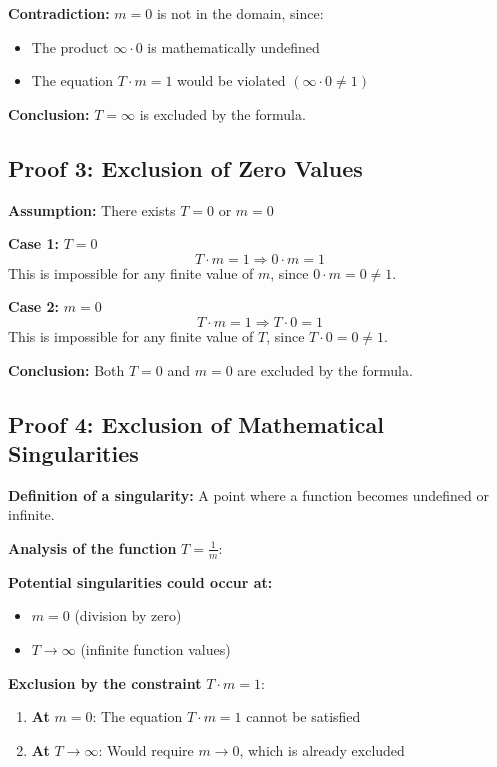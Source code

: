 	\textbf{Contradiction:} $m = 0$ is not in the domain, since:
	\begin{itemize}
		\item The product $\infty \cdot 0$ is mathematically undefined
		\item The equation $T \cdot m = 1$ would be violated $(\infty \cdot 0 \neq 1)$
	\end{itemize}
	
	\textbf{Conclusion:} $T = \infty$ is excluded by the formula.
	
	\subsection{Proof 3: Exclusion of Zero Values}
	
	\textbf{Assumption:} There exists $T = 0$ or $m = 0$
	
	\textbf{Case 1:} $T = 0$
	\begin{equation}
		T \cdot m = 1 \Rightarrow 0 \cdot m = 1
	\end{equation}
	This is impossible for any finite value of $m$, since $0 \cdot m = 0 \neq 1$.
	
	\textbf{Case 2:} $m = 0$
	\begin{equation}
		T \cdot m = 1 \Rightarrow T \cdot 0 = 1
	\end{equation}
	This is impossible for any finite value of $T$, since $T \cdot 0 = 0 \neq 1$.
	
	\textbf{Conclusion:} Both $T = 0$ and $m = 0$ are excluded by the formula.
	
	\subsection{Proof 4: Exclusion of Mathematical Singularities}
	
	\textbf{Definition of a singularity:} A point where a function becomes undefined or infinite.
	
	\textbf{Analysis of the function} $T = \frac{1}{m}$:
	
	\textbf{Potential singularities could occur at:}
	\begin{itemize}
		\item $m = 0$ (division by zero)
		\item $T \to \infty$ (infinite function values)
	\end{itemize}
	
	\textbf{Exclusion by the constraint} $T \cdot m = 1$:
	\begin{enumerate}
		\item \textbf{At} $m = 0$: The equation $T \cdot m = 1$ cannot be satisfied
		\item \textbf{At} $T \to \infty$: Would require $m \to 0$, which is already excluded
	\end{enumerate}
	
